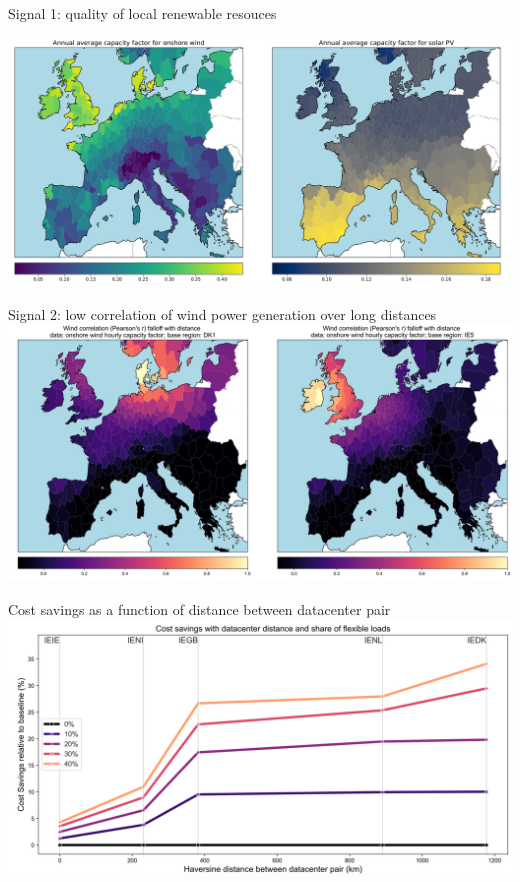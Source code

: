 \begin{frame}{Signal 1: quality of local renewable resouces}

  \centering
  \vspace{0.3cm}
  \includegraphics[width=14cm]{images/results-1.png}

\end{frame}


\begin{frame}{Signal 2: low correlation of wind power generation over long distances}
  \centering
  \vspace{0.3cm}
  \includegraphics[width=14cm]{images/results-4.png}
\end{frame}


\begin{frame}{Cost savings as a function of distance between datacenter pair}
  \centering
  \vspace{0.3cm}
  \includegraphics[width=14cm]{images/results-5.png}
\end{frame}


